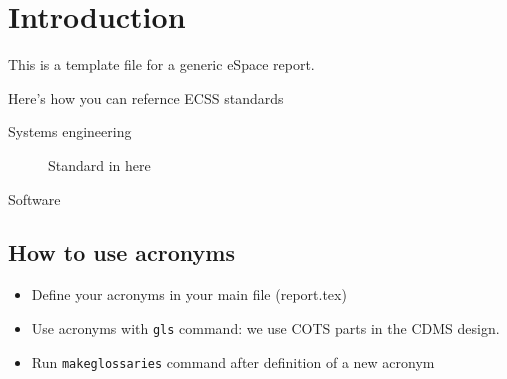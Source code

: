 \section{Introduction}

This is a template file for a generic eSpace report. 

Here's how you can refernce ECSS standards

\begin{description}
\item[Systems engineering] Standard in here \cite{ECSS-E-ST-10C}
\item[Software] \cite{ECSS-E-ST-70-01C, ECSS-E-ST-70-32C} \cite{ECSS-E-ST-40C}
\end{description}

\subsection{How to use acronyms} 

\begin{itemize}
\item Define your acronyms in your main file (report.tex) 
\item Use acronyms with \texttt{gls} command: we use \gls{COTS} parts
  in the \gls{CDMS} design. 
\item Run \texttt{makeglossaries} command after definition of a new acronym 
\end{itemize}

